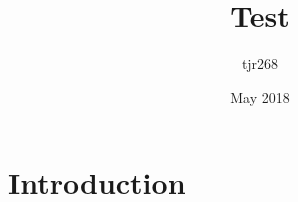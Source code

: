 \documentclass{article}
\title{Test}
\author{tjr268 }
\date{May 2018}
\begin{document}
\maketitle

\section{Introduction}
\end{document}
